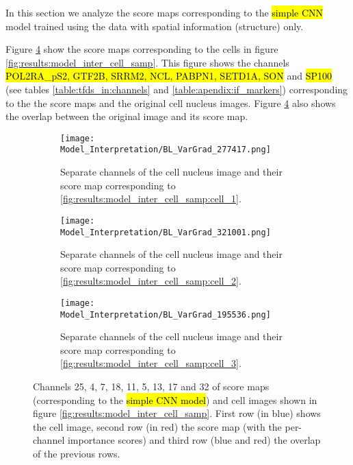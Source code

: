 
\graphicspath{{./Sections/Results/Resources/}}

In this section we analyze the score maps corresponding to the \hl{simple CNN} model trained using the data with spatial information (structure) only.

Figure \ref{fig:results:model_inter:sm} show the score maps corresponding to the cells in figure \ref{fig:results:model_inter_cell_samp}. This figure shows the channels \hl{POL2RA\_pS2, GTF2B, SRRM2, NCL, PABPN1, SETD1A, SON} and \hl{SP100} (see tables \ref{table:tfds_in:channels} and \ref{table:apendix:if_markers}) corresponding to the the score maps and the original cell nucleus images.
Figure \ref{fig:results:model_inter:sm} also shows the overlap between the original image and its score map.

  \begin{figure}
    \centering
    \begin{subfigure}[b]{\linewidth}
      \texttt{[image: Model\_Interpretation/BL\_VarGrad\_277417.png]}
      \caption{Separate channels of the cell nucleus image and their score map corresponding to \ref{fig:results:model_inter_cell_samp:cell_1}.}
      \label{fig:results:model_inter:sm:cell_1}
    \end{subfigure}%
    \vspace{3mm}
    \begin{subfigure}[b]{\linewidth}
      \texttt{[image: Model\_Interpretation/BL\_VarGrad\_321001.png]}
      \caption{Separate channels of the cell nucleus image and their score map corresponding to \ref{fig:results:model_inter_cell_samp:cell_2}.}
      \label{fig:results:model_inter:sm:cell_2}
    \end{subfigure}%
    \vspace{3mm}
    \begin{subfigure}[b]{\linewidth}
      \texttt{[image: Model\_Interpretation/BL\_VarGrad\_195536.png]}
      \caption{Separate channels of the cell nucleus image and their score map corresponding to \ref{fig:results:model_inter_cell_samp:cell_3}.}
      \label{fig:results:model_inter:sm:cell_3}
    \end{subfigure}
    \caption{Channels 25, 4, 7, 18, 11, 5, 13, 17 and 32 of score maps (corresponding to the \hl{simple CNN model}) and cell images shown in figure \ref{fig:results:model_inter_cell_samp}. First row (in blue) shows the cell image, second row (in red) the score map (with the per-channel importance scores) and third row (blue and red) the overlap of the previous rows.}
    \label{fig:results:model_inter:sm}
  \end{figure}

